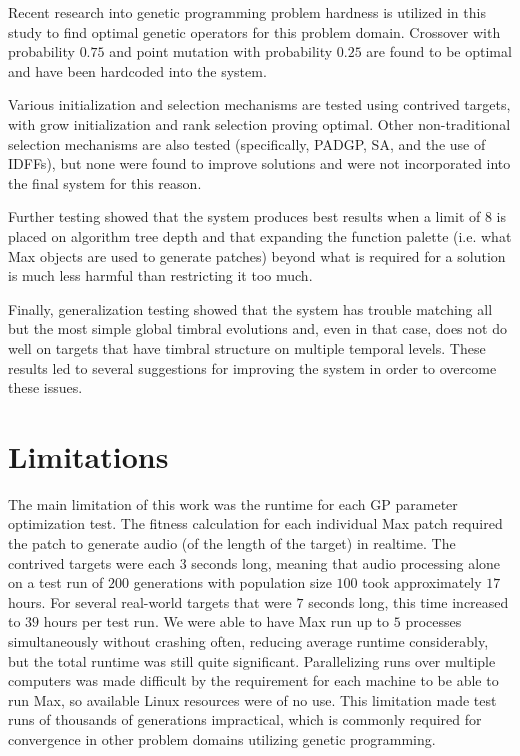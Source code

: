 \documentclass[12pt]{report} 	%
\numberwithin{figure}{chapter}
\numberwithin{table}{chapter}
\numberwithin{equation}{chapter}
\begin{document}
\begin{flushleft}
Recent research into genetic programming problem hardness is utilized in this study to find optimal genetic operators for this problem domain. Crossover with probability $0.75$ and point mutation with probability $0.25$ are found to be optimal and have been hardcoded into the system.

Various initialization and selection mechanisms are tested using contrived targets, with grow initialization and rank selection proving optimal. Other non-traditional selection mechanisms are also tested (specifically, PADGP, SA, and the use of IDFFs), but none were found to improve solutions and were not incorporated into the final system for this reason.

Further testing showed that the system produces best results when a limit of $8$ is placed on algorithm tree depth and that expanding the function palette (i.e. what Max objects are used to generate patches) beyond what is required for a solution is much less harmful than restricting it too much.

Finally, generalization testing showed that the system has trouble matching all but the most simple global timbral evolutions and, even in that case, does not do well on targets that have timbral structure on multiple temporal levels. These results led to several suggestions for improving the system in order to overcome these issues.

\section{Limitations}
The main limitation of this work was the runtime for each GP parameter optimization test. The fitness calculation for each individual Max patch required the patch to generate audio (of the length of the target) in realtime. The contrived targets were each $3$ seconds long, meaning that audio processing alone on a test run of $200$ generations with population size $100$ took approximately $17$ hours. For several real-world targets that were $7$ seconds long, this time increased to $39$ hours per test run. We were able to have Max run up to $5$ processes simultaneously without crashing often, reducing average runtime considerably, but the total runtime was still quite significant. Parallelizing runs over multiple computers was made difficult by the requirement for each machine to be able to run Max, so available Linux resources were of no use. This limitation made test runs of thousands of generations impractical, which is commonly required for convergence in other problem domains utilizing genetic programming.


\end{flushleft}
\end{document}
